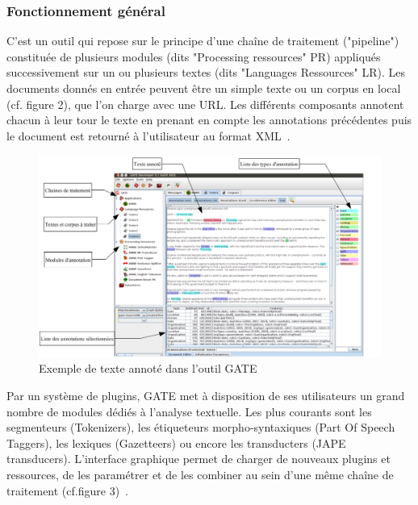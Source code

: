 \documentclass[a4paper, 11pt]{report}
\begin{document}
\subsubsection{Fonctionnement général}
C'est un outil qui repose sur le principe d'une chaîne de traitement ("pipeline") constituée de plusieurs modules (dits "Processing ressources" PR) appliqués successivement sur un ou plusieurs textes (dits "Languages Ressources" LR). Les documents donnés en entrée peuvent être un simple texte ou un corpus en local (cf. figure 2), que l'on charge avec une URL. Les différents composants annotent chacun à leur tour le texte en prenant en compte les annotations précédentes puis le document est retourné à l'utilisateur au format XML~\cite{SL10}.
\begin{figure}[H]
\begin{center}
\includegraphics[scale=0.3]{img/exempleAnnotationGATE.png} 
\end{center}
\caption{Exemple de texte annoté dans l'outil GATE}
\end{figure}
Par un système de plugins, GATE met à disposition de ses utilisateurs un grand nombre de
modules dédiés à l'analyse textuelle. Les plus courants sont les segmenteurs (Tokenizers), les
étiqueteurs morpho-syntaxiques (Part Of Speech Taggers), les lexiques (Gazetteers) ou encore les
transducters (JAPE transducers). L'interface graphique permet de charger de nouveaux plugins et
ressources, de les paramétrer et de les combiner au sein d'une même chaîne de traitement (cf.figure 3)~\cite{SL10}.
\end{document}
